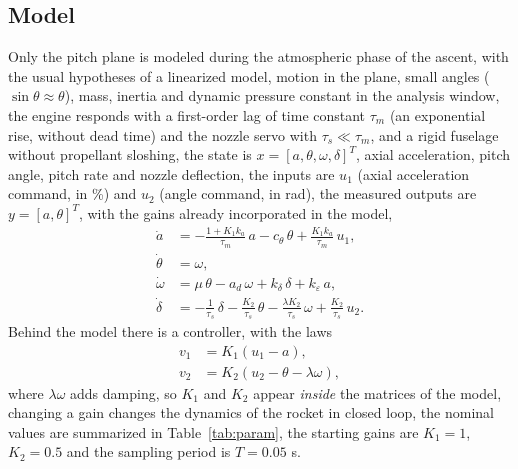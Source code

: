 \documentclass[article, 11pt]{IEEEtran}   %
\begin{document}
\subsection{Model}
Only the pitch plane is modeled during the atmospheric phase of the ascent, with the usual hypotheses of a linearized model, motion in the plane, small angles ($\sin\theta\approx\theta$), mass, inertia and dynamic pressure constant in the analysis window, the engine responds with a first-order lag of time constant $\tau_m$ (an exponential rise, without dead time) and the nozzle servo with $\tau_s\ll\tau_m$, and a rigid fuselage without propellant sloshing, the state is $x=[a,\theta,\omega,\delta]^T$, axial acceleration, pitch angle, pitch rate and nozzle deflection, the inputs are $u_1$ (axial acceleration command, in \%) and $u_2$ (angle command, in rad), the measured outputs are $y=[a,\theta]^T$, with the gains already incorporated in the model,
\begin{align}
\dot a &= -\tfrac{1+K_1k_a}{\tau_m}\,a-c_\theta\,\theta+\tfrac{K_1k_a}{\tau_m}\,u_1,\label{eq:a}\\
\dot\theta &= \omega,\label{eq:th}\\
\dot\omega &= \mu\,\theta-a_d\,\omega+k_\delta\,\delta+k_\varepsilon\,a,\label{eq:om}\\
\dot\delta &= -\tfrac{1}{\tau_s}\,\delta-\tfrac{K_2}{\tau_s}\,\theta-\tfrac{\lambda K_2}{\tau_s}\,\omega+\tfrac{K_2}{\tau_s}\,u_2.\label{eq:de}
\end{align}
Behind the model there is a controller, with the laws
\begin{align}
v_1&=K_1(u_1-a),\label{eq:v1}\\
v_2&=K_2(u_2-\theta-\lambda\omega),\label{eq:v2}
\end{align}
where $\lambda\omega$ adds damping, so $K_1$ and $K_2$ appear \emph{inside} the matrices of the model, changing a gain changes the dynamics of the rocket in closed loop, the nominal values are summarized in Table~\ref{tab:param}, the starting gains are $K_1=1$, $K_2=0.5$ and the sampling period is $T=0.05$ s.
\end{document}
